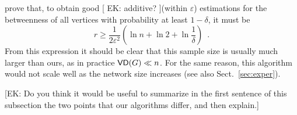 prove that, to obtain good [ EK: additive? ](within $\varepsilon$) estimations for the
betweenness of all vertices with probability at least $1-\delta$, it must be
\[
r\geq \frac{1}{2\varepsilon^2}\left(\ln n + \ln 2 +\ln\frac{1}{\delta}\right)\enspace.
\]
From this expression it should be clear that this sample size is usually much
larger than ours, as in practice $\mathsf{VD}(G)\ll n$. For the same reason, this
algorithm would not scale well as the network size increases (see also
Sect.~\ref{sec:exper}).

[EK: Do you think it would be useful to summarize in the first sentence of this subsection
the two points that our algorithms differ, and then explain.]

